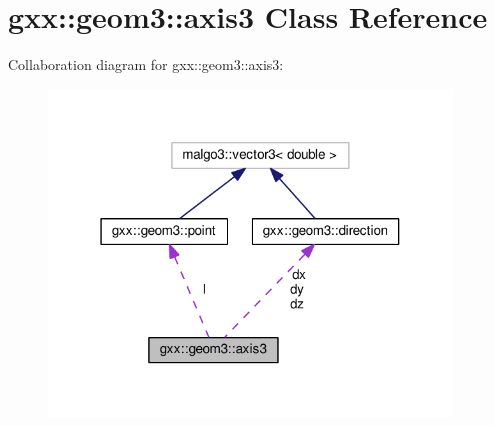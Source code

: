\hypertarget{classgxx_1_1geom3_1_1axis3}{}\section{gxx\+:\+:geom3\+:\+:axis3 Class Reference}
\label{classgxx_1_1geom3_1_1axis3}


Collaboration diagram for gxx\+:\+:geom3\+:\+:axis3\+:
\nopagebreak
\begin{figure}[H]
\begin{center}
\leavevmode
\includegraphics[width=304pt]{classgxx_1_1geom3_1_1axis3__coll__graph}
\end{center}
\end{figure}
